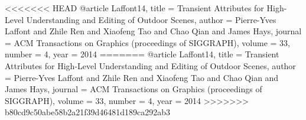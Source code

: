 <<<<<<< HEAD
@article {Laffont14,
    title = {Transient Attributes for High-Level Understanding and Editing of Outdoor Scenes},
    author = {Pierre-Yves Laffont and Zhile Ren and Xiaofeng Tao and Chao Qian and James Hays},
    journal = {ACM Transactions on Graphics (proceedings of SIGGRAPH)},
    volume = {33},
    number = {4},
    year = {2014}
}
=======
@article {Laffont14,
    title = {Transient Attributes for High-Level Understanding and Editing of Outdoor Scenes},
    author = {Pierre-Yves Laffont and Zhile Ren and Xiaofeng Tao and Chao Qian and James Hays},
    journal = {ACM Transactions on Graphics (proceedings of SIGGRAPH)},
    volume = {33},
    number = {4},
    year = {2014}
}
>>>>>>> b80cd9c50abe58b2a21f39d46481d189ca292ab3
